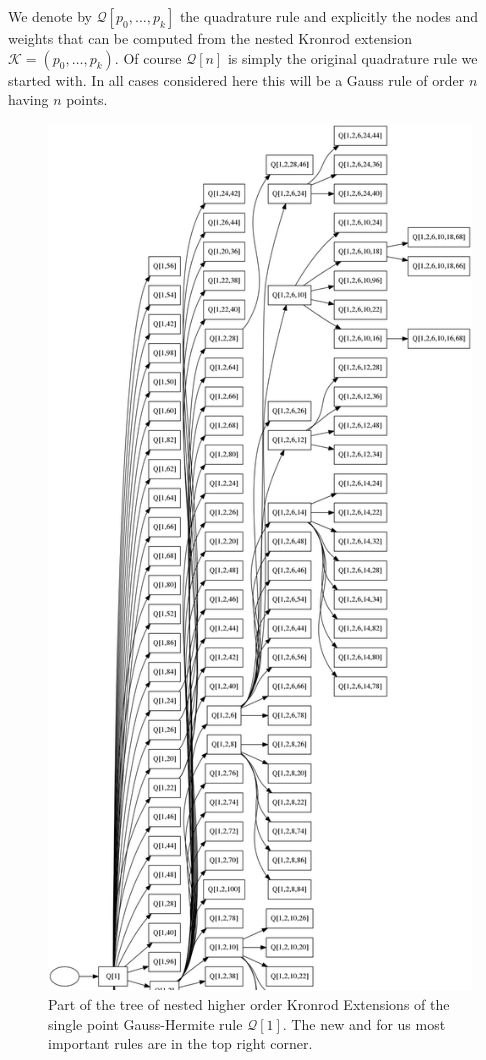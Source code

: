 \documentclass[a4paper,10pt]{article}
\begin{document}
We denote by $\mathcal{Q}[p_0, \ldots, p_k]$ the quadrature rule and explicitly
the nodes and weights that can be computed from the nested Kronrod extension
$\mathcal{K} = (p_0, \ldots, p_k)$. Of course $\mathcal{Q}[n]$ is simply the
original quadrature rule we started with. In all cases considered here this
will be a Gauss rule of order $n$ having $n$ points.

\begin{figure}
  \centering
  \includegraphics[width=0.8\linewidth]{./img/graph_hermite_1_100_6_part.png}
  \caption{Part of the tree of nested higher order Kronrod Extensions of the
  single point Gauss-Hermite rule $\mathcal{Q}[1]$.
  The new and for us most important rules are in the top right corner.}
  \label{fig:graph_1_100_6_part}
\end{figure}
\end{document}

